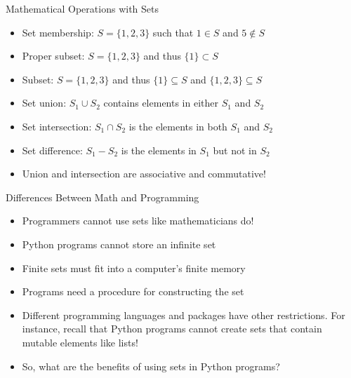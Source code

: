 \documentclass[14pt,aspectratio=169]{beamer}
\begin{document}
%
\begin{frame}{Mathematical Operations with Sets}
  \begin{itemize}
    \item Set membership: $S = \{1, 2, 3\}$ such that $1 \in S$ and $5 \notin S$
      \vspace*{-.15in}
    \item Proper subset: $S = \{1, 2, 3\}$ and thus $\{1\} \subset S$
      \vspace*{-.15in}
    \item Subset: $S = \{1, 2, 3\}$ and thus $\{1\} \subseteq S$ and $\{1, 2, 3\} \subseteq S$
      \vspace*{-.15in}
    \item Set union: $S_1 \cup S_2$ contains elements in either $S_1$ and $S_2$
      \vspace*{-.15in}
    \item Set intersection: $S_1 \cap S_2$ is the elements in both $S_1$ and $S_2$
      \vspace*{-.15in}
    \item Set difference: $S_1 - S_2$ is the elements in $S_1$ but not in $S_2$
      \vspace*{-.15in}
    \item Union and intersection are associative and commutative!
  \end{itemize}
\end{frame}

%
\begin{frame}{Differences Between Math and Programming}
  \begin{itemize}
    \item Programmers cannot use sets like mathematicians do!
      \vspace*{-.15in}
    \item Python programs cannot store an infinite set
      \vspace*{-.15in}
    \item Finite sets must fit into a computer's finite memory
      \vspace*{-.15in}
    \item Programs need a procedure for constructing the set
      \vspace*{-.15in}
    \item Different programming languages and packages have other restrictions.
      For instance, recall that Python programs cannot create sets that contain
      mutable elements like lists!
      \vspace*{-.15in}
    \item So, what are the benefits of using sets in Python programs?
  \end{itemize}
\end{frame}
\end{document}
